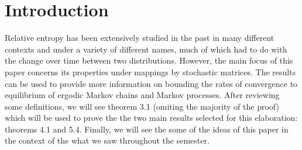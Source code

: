 \section{Introduction}

Relative entropy has been extensively studied in the past in many different contexts and under a variety of different names, much of which had to do with the change over time between two distributions. However, the main focus of this paper concerns its properties under mappings by stochastic matrices. The results can be used to provide more information on bounding the rates of convergence to equilibrium of ergodic Markov chains and Markov processes. After reviewing some definitions, we will see theorem 3.1 (omiting the majority of the proof) which will be used to prove the the two main results selected for this elaboration: theorems 4.1 and 5.4. Finally, we will see the some of the ideas of this paper in the context of the what we saw throughout the semester.

